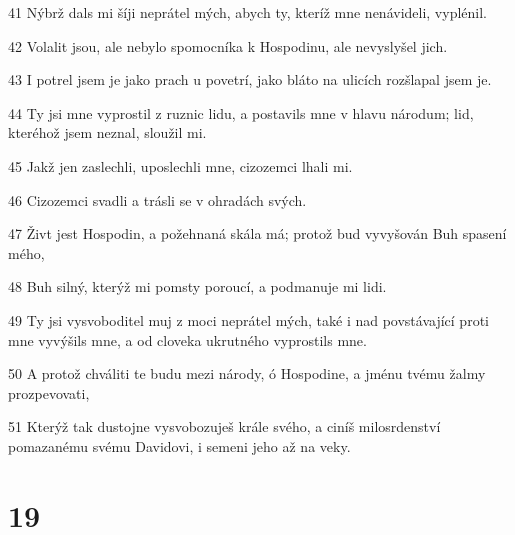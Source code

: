 \par 41 Nýbrž dals mi šíji neprátel mých, abych ty, kteríž mne nenávideli, vyplénil.
\par 42 Volalit jsou, ale nebylo spomocníka k Hospodinu, ale nevyslyšel jich.
\par 43 I potrel jsem je jako prach u povetrí, jako bláto na ulicích rozšlapal jsem je.
\par 44 Ty jsi mne vyprostil z ruznic lidu, a postavils mne v hlavu národum; lid, kteréhož jsem neznal, sloužil mi.
\par 45 Jakž jen zaslechli, uposlechli mne, cizozemci lhali mi.
\par 46 Cizozemci svadli a trásli se v ohradách svých.
\par 47 Živt jest Hospodin, a požehnaná skála má; protož bud vyvyšován Buh spasení mého,
\par 48 Buh silný, kterýž mi pomsty poroucí, a podmanuje mi lidi.
\par 49 Ty jsi vysvoboditel muj z moci neprátel mých, také i nad povstávající proti mne vyvýšils mne, a od cloveka ukrutného vyprostils mne.
\par 50 A protož chváliti te budu mezi národy, ó Hospodine, a jménu tvému žalmy prozpevovati,
\par 51 Kterýž tak dustojne vysvobozuješ krále svého, a ciníš milosrdenství pomazanému svému Davidovi, i semeni jeho až na veky.

\chapter{19}

